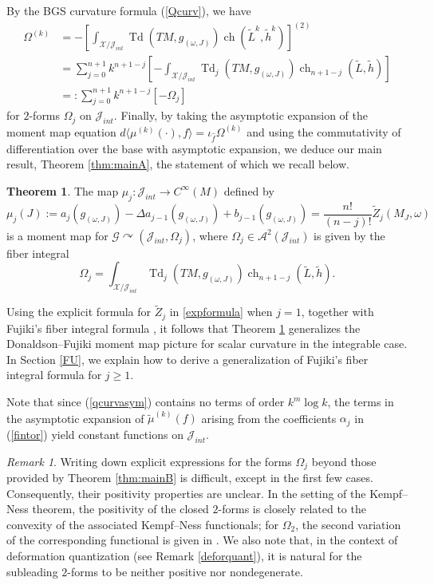 \documentclass[12pt,reqno,a4paper]{amsart}
\numberwithin{equation}{section}
\DeclareMathOperator{\Td}{Td}
\DeclareMathOperator{\ch}{ch}
\theoremstyle{definition}
\newtheorem{theorem}{Theorem}
\theoremstyle{remark}
\newtheorem{remark}{Remark}
\begin{document}
By the BGS curvature formula (\ref{Qcurv}), we have
\begin{align}\label{qcurvasym}
\Omega^{(k)}&=-\left[\int_{\mathcal{X}/\mathcal{J}_{int}}\Td(TM,g_{(\omega,J)})\ch(\widetilde{L}^k,\widetilde{h}^k)\right]^{(2)}\nonumber\\
&=\sum_{j=0}^{n+1}k^{n+1-j}\left[-\int_{\mathcal{X}/\mathcal{J}_{int}}\Td_j(TM,g_{(\omega,J)})\ch_{n+1-j}(\widetilde{L},\widetilde{h})\right]\nonumber\\
&=:\sum_{j=0}^{n+1}k^{n+1-j} \left[-\Omega_j\right]
\end{align}
for $2$-forms $\Omega_j$ on $\mathcal{J}_{int}$. Finally, by taking the asymptotic expansion of the moment map equation $d\langle \mu^{(k)}(\cdot),f\rangle=\iota_{\widehat{f}}\Omega^{(k)}$ and using the commutativity of differentiation over the base with asymptotic expansion, we deduce our main result, Theorem \ref{thm:mainA}, the statement of which we recall below.
\begin{theorem}\label{main}
The map $\mu_j:\mathcal{J}_{int}\rightarrow C^\infty(M)$ defined by 
\begin{equation*}
\mu_j(J):=a_j\left(g_{(\omega,J)}\right)-\Delta a_{j-1}\left(g_{(\omega,J)}\right)+b_{j-1}\left(g_{(\omega,J)}\right)=\frac{n!}{(n-j)!}\widetilde{Z}_j(M_J,\omega)
\end{equation*}
is a moment map for $\mathcal{G}\curvearrowright (\mathcal{J}_{int},\Omega_j)$, where $\Omega_j\in \mathcal{A}^2(\mathcal{J}_{int})$ is given by the fiber integral
\begin{equation*}
\Omega_j=\int_{\mathcal{X}/\mathcal{J}_{int}}\Td_j(TM,g_{(\omega,J)})\ch_{n+1-j}(\widetilde{L},\widetilde{h}).
\end{equation*}
\end{theorem}
Using the explicit formula for $\widetilde{Z}_j$ in \eqref{expformula} when $j=1$, together with Fujiki's fiber integral formula \cite[Theorem 4.4]{fujiki1992moduli}, it follows that Theorem \ref{main} generalizes the Donaldson--Fujiki moment map picture for scalar curvature in the integrable case. In Section \ref{FU}, we explain how to derive a generalization of Fujiki's fiber integral formula for $j\geq 1$. 

Note that since (\ref{qcurvasym}) contains no terms of order $k^{m}\log k$, the terms in the asymptotic expansion of $\widetilde{\mu}^{(k)}(f)$ arising from the coefficients $\alpha_j$ in (\ref{fintor}) yield constant functions on $\mathcal{J}_{int}$.

\begin{remark}
Writing down explicit expressions for the forms $\Omega_j$ beyond those provided by Theorem \ref{thm:mainB} is difficult, except in the first few cases. Consequently, their positivity properties are unclear. In the setting of the Kempf--Ness theorem, the positivity of the closed $2$-forms is closely related to the convexity of the associated Kempf--Ness functionals; for $\Omega_2$, the second variation of the corresponding functional is given in \cite[Proposition 1]{eum2025partition}. We also note that, in the context of deformation quantization (see Remark \ref{deforquant}), it is natural for the subleading $2$-forms to be neither positive nor nondegenerate.
\end{remark}
\end{document}
